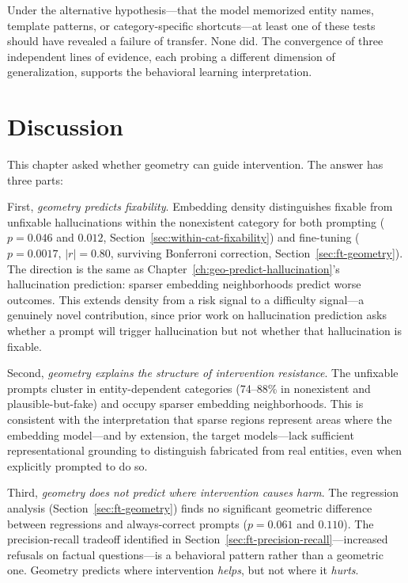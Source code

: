 Under the alternative hypothesis---that the model memorized entity names, template patterns, or category-specific shortcuts---at least one of these tests should have revealed a failure of transfer. None did. The convergence of three independent lines of evidence, each probing a different dimension of generalization, supports the behavioral learning interpretation.


\section{Discussion}
\label{sec:ch7-discussion}

This chapter asked whether geometry can guide intervention. The answer has three parts:

First, \emph{geometry predicts fixability}. Embedding density distinguishes fixable from unfixable hallucinations within the nonexistent category for both prompting ($p = 0.046$ and $0.012$, Section~\ref{sec:within-cat-fixability}) and fine-tuning ($p = 0.0017$, $|r| = 0.80$, surviving Bonferroni correction, Section~\ref{sec:ft-geometry}). The direction is the same as Chapter~\ref{ch:geo-predict-hallucination}'s hallucination prediction: sparser embedding neighborhoods predict worse outcomes. This extends density from a risk signal to a difficulty signal---a genuinely novel contribution, since prior work on hallucination prediction asks whether a prompt will trigger hallucination but not whether that hallucination is fixable.

Second, \emph{geometry explains the structure of intervention resistance}. The unfixable prompts cluster in entity-dependent categories (74--88\% in nonexistent and plausible-but-fake) and occupy sparser embedding neighborhoods. This is consistent with the interpretation that sparse regions represent areas where the embedding model---and by extension, the target models---lack sufficient representational grounding to distinguish fabricated from real entities, even when explicitly prompted to do so.

Third, \emph{geometry does not predict where intervention causes harm}. The regression analysis (Section~\ref{sec:ft-geometry}) finds no significant geometric difference between regressions and always-correct prompts ($p = 0.061$ and $0.110$). The precision-recall tradeoff identified in Section~\ref{sec:ft-precision-recall}---increased refusals on factual questions---is a behavioral pattern rather than a geometric one. Geometry predicts where intervention \emph{helps}, but not where it \emph{hurts}.

